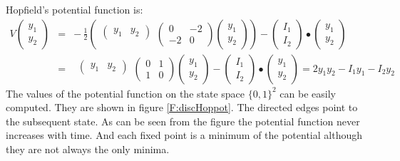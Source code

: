   Hopfield's potential function is:
\begin{eqnarray*}
V
\begin{pmatrix}
y_1 \\  y_2
\end{pmatrix}
 &=& -\,\displaystyle{\frac{1}{2}} \left(
  \begin{matrix}\begin{pmatrix}y_1 & y_2\end{pmatrix}\\\mbox{}\end{matrix}
  \begin{pmatrix} 0 & -2 \\ -2 & 0 \end{pmatrix} 
  \begin{pmatrix} y_1 \\ y_2 \end{pmatrix} \right) 
-
\begin{pmatrix}
I_1 \\ I_2 
\end{pmatrix}
\bullet
\begin{pmatrix}
y_1 \\ y_2 
\end{pmatrix} \\
~ &=& 
  \begin{matrix}\begin{pmatrix}y_1 & y_2\end{pmatrix}\\\mbox{}\end{matrix}
  \begin{pmatrix} 0 & 1 \\ 1 & 0 \end{pmatrix} 
  \begin{pmatrix} y_1 \\ y_2 \end{pmatrix} 
-
\begin{pmatrix}
I_1 \\ I_2 
\end{pmatrix}
\bullet
\begin{pmatrix}
y_1 \\ y_2 
\end{pmatrix} = 2 y_1 y_2 - I_1 y_1 - I_2 y_2
\end{eqnarray*}
The values of the potential function on the state space $\{0,1\}^2$ can be
easily computed.  They are shown in figure \ref{F:discHoppot}.  The directed 
edges point to the subsequent state.  As can be seen from the figure the 
potential function never increases with time.  And each fixed point is a 
minimum of the potential although they are not always the only minima.

